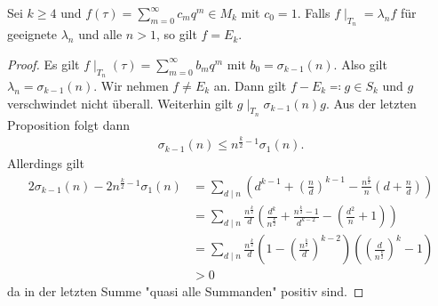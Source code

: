 \begin{prop}
Sei $k\geq 4$ und $f(\tau)=\sum_{m=0}^\infty c_mq^m\in M_k$ mit $c_0=1$.
Falls $f\mid_{T_n}=\lambda_n f$ für geeignete $\lambda_n$ und alle $n>1$, so gilt $f=E_k$.
\end{prop}
\begin{proof}
Es gilt $f\mid_{T_n}(\tau)=\sum_{m=0}^\infty b_mq^m$ mit $b_0=\sigma_{k-1}(n)$.
Also gilt $\lambda_n=\sigma_{k-1}(n)$.
Wir nehmen $f\not =E_k$ an.
Dann gilt $f-E_k \eqqcolon g \in S_k$ und $g$ verschwindet nicht überall.
Weiterhin gilt $g\mid_{T_n} \sigma_{k-1}(n)g$.
Aus der letzten Proposition folgt dann
\begin{align*}
\sigma_{k-1}(n)\leq n^{\frac{k}{2}-1 }\sigma_1(n).
\end{align*}
Allerdings gilt
\begin{align*}
2\sigma_{k-1}(n)-2n^{\frac{k}{2}-1} \sigma_1(n)&=\sum_{d\mid n}  \left(d^{k-1}+\left(\frac{n}{d}\right)^{k-1}-\frac{n^{\frac{k}{2}}}{n}(d+\frac{n}{d})\right)\\
&=\sum_{d \mid n} \frac{n^{\frac{k}{2}}}{d}\left(\frac{d^k}{n^{\frac{k}{2}}}+\frac{n^{\frac{k}{2}}-1}{d^{k-2}}-\left(\frac{d^2}{n}+1\right) \right)\\
&=\sum_{d \mid n} \frac{n^{\frac{k}{2}}}{d} \left(1-\left(\frac{n^{\frac{k}{2}}}{d}\right)^{k-2}\right) \left(\left(\frac{d}{n^{\frac{k}{2}}}\right)^k-1\right)\\
&>0
\end{align*}
da in der letzten Summe "quasi alle Summanden" positiv sind.
\end{proof}